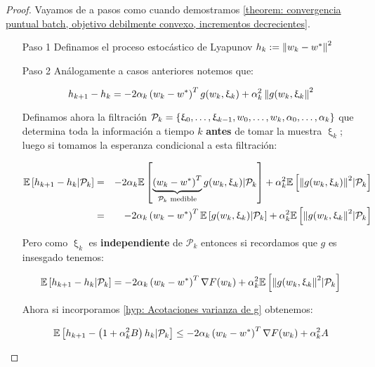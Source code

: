 \begin{proof}
	Vayamos de a pasos como cuando demostramos \ref{theorem: convergencia puntual batch, objetivo debilmente convexo, incrementos decrecientes}.
	
	\begin{enumerate}
		\item [Paso 1] Definamos el proceso estoc\'astico de Lyapunov $h_k := \left\lVert w_k - w^*\right\rVert^2$
		
		\item [Paso 2] An\'alogamente a casos anteriores notemos que:
		
		\begin{equation}
			h_{k+1} - h_k = -2 \alpha_k \left(w_k - w^*\right)^T g(w_k, \upxi_{k}) + \alpha_k^2 \left\lVert g(w_k, \upxi_{k}\right\rVert^2
		\end{equation}
		
		Definamos ahora la filtraci\'on $\mathcal{P}_k = \left\lbrace\upxi_{0}, \dots, \upxi_{k-1}, w_0, \dots, w_k, \alpha_0, \dots, \alpha_k\right\rbrace$ que determina toda la informaci\'on a tiempo $k$ \textbf{antes} de tomar la muestra $\upxi_{k}$; luego si tomamos la esperanza condicional a esta filtraci\'on:
		
		\begin{equation*}
		\begin{aligned}
			\mathbb{E} \left[{h_{k+1} - h_k } \vert \mathcal{P}_{k}\right] & = & -2 \alpha_k \mathbb{E} \left[{\underbrace{\left(w_k - w^*\right)^T}_{\mathcal{P}_k \text{ medible}} g(w_k, \upxi_{k}) } \vert \mathcal{P}_{k}\right] + \alpha_k^2 \mathbb{E} \left[{\left\lVert g(w_k, \upxi_{k})\right\rVert^2} \vert \mathcal{P}_{k}\right] \\
			& = & -2 \alpha_k \left(w_k - w^*\right)^T \mathbb{E} \left[{g(w_k, \upxi_{k})} \vert \mathcal{P}_{k}\right] + \alpha_k^2 \mathbb{E} \left[{\left\lVert g(w_k, \upxi_{k}\right\rVert^2} \vert \mathcal{P}_{k}\right] 
		\end{aligned}
		\end{equation*}
		
		Pero como $\upxi_{k}$ es \textbf{independiente } de $\mathcal{P}_k$ entonces si recordamos que $g$ es insesgado tenemos:
		
		\begin{equation*}
		\mathbb{E} \left[{h_{k+1} - h_k } \vert \mathcal{P}_{k}\right] = -2 \alpha_k \left(w_k - w^*\right)^T \nabla F(w_k) + \alpha_k^2 \mathbb{E} \left[{\left\lVert g(w_k, \upxi_{k}\right\rVert^2} \vert \mathcal{P}_{k}\right] 
		\end{equation*}		
		
		Ahora si incorporamos \ref{hyp: Acotaciones varianza de g} obtenemos:
		
		\begin{equation}
			\label{eq: variaciones proceso lyapunov}
				\mathbb{E} \left[{h_{k+1} - \left(1 + \alpha_k^2 B\right)h_k } \vert \mathcal{P}_{k}\right] \leq  -2 \alpha_k \left(w_k - w^*\right)^T \nabla F(w_k) + \alpha_k^2 A
		\end{equation}
		

\end{enumerate}
\end{proof}
